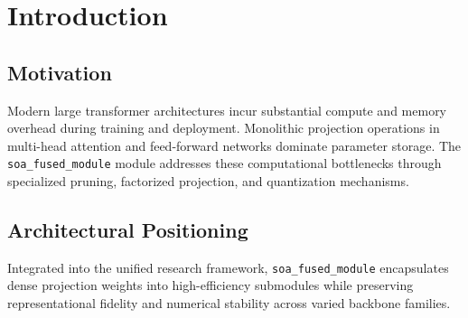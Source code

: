 \section{Introduction}

\subsection{Motivation}
Modern large transformer architectures incur substantial compute and memory overhead during training and deployment. Monolithic projection operations in multi-head attention and feed-forward networks dominate parameter storage. The \texttt{soa_fused_module} module addresses these computational bottlenecks through specialized pruning, factorized projection, and quantization mechanisms.

\subsection{Architectural Positioning}
Integrated into the unified research framework, \texttt{soa_fused_module} encapsulates dense projection weights into high-efficiency submodules while preserving representational fidelity and numerical stability across varied backbone families.
